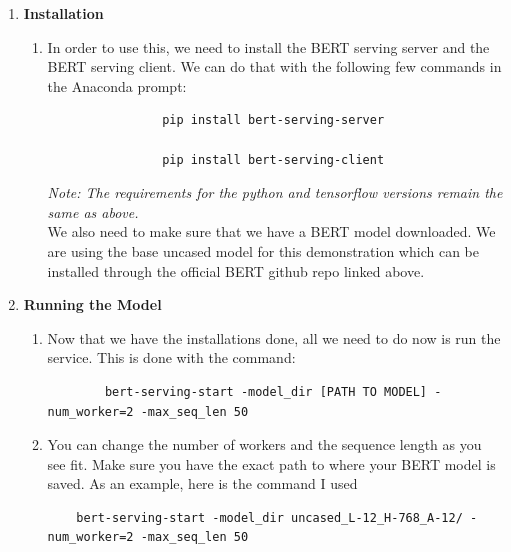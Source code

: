 \documentclass{article}
\begin{document}
\begin{enumerate}
    \item \textbf{Installation}
    \begin{enumerate}
        \item[] In order to use this, we need to install the BERT serving server and the BERT serving client. We can do that with the following few commands in the Anaconda prompt:
        \begin{center}
            \begin{verbatim}
                pip install bert-serving-server
                
                pip install bert-serving-client
            \end{verbatim}
        \end{center}
        \textit{Note: The requirements for the python and tensorflow versions remain the same as above.}
            \vspace{.2cm}\\
            We also need to make sure that we have a BERT model downloaded.  We are using the base uncased model for this demonstration which can be installed through the official BERT github repo linked above.
            
    \end{enumerate}
    
    
    \item \textbf{Running the Model}
    \begin{enumerate}
        \item[] Now that we have the installations done, all we need to do now is run the service.  This is done with the command:
            \begin{verbatim}
        bert-serving-start -model_dir [PATH TO MODEL] -num_worker=2 -max_seq_len 50
            \end{verbatim}
            
            \item[] You can change the number of workers and the sequence length as you see fit.  Make sure you have the exact path to where your BERT model is saved.  As an example, here is the command I used
            \begin{verbatim}
    bert-serving-start -model_dir uncased_L-12_H-768_A-12/ -num_worker=2 -max_seq_len 50
            \end{verbatim}
    \end{enumerate}
    

\end{enumerate}
\end{document}
